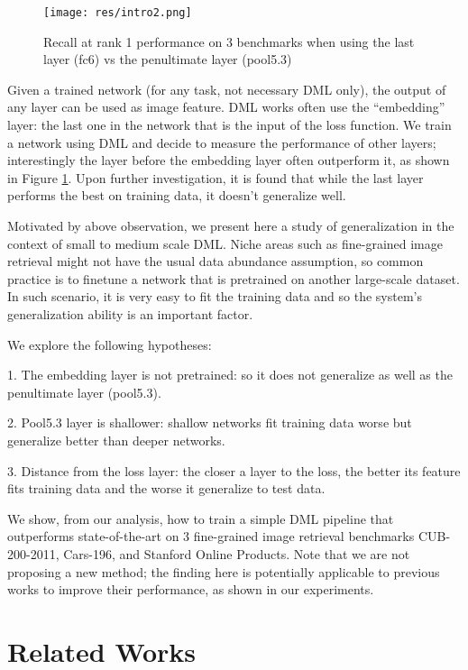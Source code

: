 \documentclass[10pt,twocolumn,letterpaper]{article}
\begin{document}
\begin{figure}
  \texttt{[image: res/intro2.png]}
  \caption{Recall at rank 1 performance on 3 benchmarks when using the last layer (fc6) vs the penultimate layer (pool5.3)}
  \label{fig:intro}
\end{figure}



Given a trained network (for any task, not necessary DML only), the output of any layer can be used as image feature. DML works often use the ``embedding'' layer: the last one in the network that is the input of the loss function. We train a network using DML and decide to measure the performance of other layers; interestingly the layer before the embedding layer often outperform it, as shown in Figure \ref{fig:intro}. Upon further investigation, it is found that while the last layer performs the best on training data, it doesn't generalize well.

Motivated by above observation, we present here a study of generalization in the context of small to medium scale DML. Niche areas such as fine-grained image retrieval might not have the usual data abundance assumption, so common practice is to finetune a network that is pretrained on another large-scale dataset. In such scenario, it is very easy to fit the training data and so the system's generalization ability is an important factor.

We explore the following hypotheses:

1. The embedding layer is not pretrained: so it does not generalize as well as the penultimate layer (pool5.3).

2. Pool5.3 layer is shallower: shallow networks fit training data worse but generalize better than deeper networks.

3. Distance from the loss layer: the closer a layer to the loss, the better its feature fits training data and the worse it generalize to test data.

We show, from our analysis, how to train a simple DML pipeline that outperforms state-of-the-art on 3 fine-grained image retrieval benchmarks CUB-200-2011, Cars-196, and Stanford Online Products. Note that we are not proposing a new method; the finding here is potentially applicable to previous works to improve their performance, as shown in our experiments.


\section{Related Works}
\end{document}
